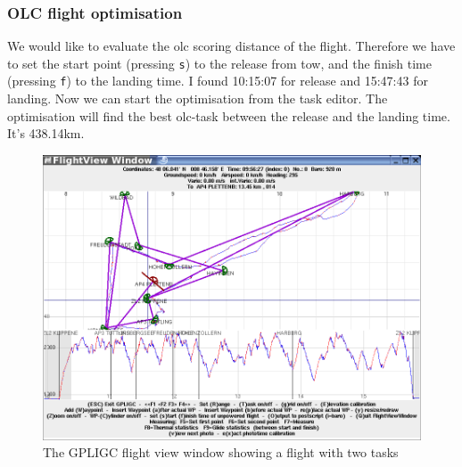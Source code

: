 \subsubsection{OLC flight optimisation}
We would like to evaluate the olc scoring distance of the flight. Therefore we have to set the start
point (pressing \texttt{s}) to the release from tow, and the finish time (pressing \texttt{f}) to the landing time.
I found 10:15:07 for release and 15:47:43 for landing. Now we can start the optimisation from the task editor.
The optimisation will find the best olc-task between the release and the landing time. It's 438.14km.






\begin{figure}[h]
\caption{\label{flightview}The GPLIGC flight view window showing a flight with two tasks}
\begin{center}
\includegraphics[width=\textwidth]{png/flightview-1}
\end{center}
\end{figure}

